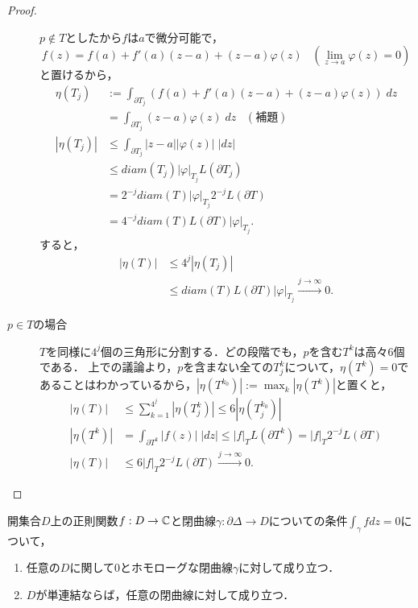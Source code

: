 \documentclass[uplatex, dvipdfmx]{jsreport}
\begin{document}
\begin{proof}
\begin{description}
        $p\notin T$としたから$f$は$a$で微分可能で，
        \[ f(z)=f(a)+f'(a)(z-a)+(z-a)\varphi(z)\;\;\;(\lim_{z\to a}\varphi(z)=0) \]
        と置けるから，
        \begin{align*}
            \eta(T_j)&:=\int_{\partial T_j}(f(a)+f'(a)(z-a)+(z-a)\varphi(z))\;dz\\
            &=\int_{\partial T_j}(z-a)\varphi(z)\;dz\;\;\;(補題)\\
            |\eta(T_j)|&\le\int_{\partial T_j}|z-a||\varphi(z)|\;|dz|\\
            &\le diam(T_j)|\varphi|_{T_j}L(\partial T_j)\\
            &= 2^{-j}diam(T)|\varphi|_{T_j}2^{-j}L(\partial T)\\
            &= 4^{-j}diam(T)L(\partial T)|\varphi|_{T_j}.
        \end{align*}
        すると，
        \begin{align*}
            |\eta(T)|&\le 4^j|\eta(T_j)|\\
            &\le diam(T)L(\partial T)|\varphi|_{T_j}\xrightarrow{j\to\infty}0.
        \end{align*}
        \item[$p\in T$の場合] $T$を同様に$4^j$個の三角形に分割する．どの段階でも，$p$を含む$T^k$は高々$6$個である．
        上での議論より，$p$を含まない全ての$T^k_j$について，$\eta(T^k)=0$であることはわかっているから，$|\eta(T^{k_0})|:=\max_{k}|\eta(T^k)|$と置くと，
        \begin{align*}
            |\eta(T)|&\le\sum^{4^j}_{k=1}|\eta(T^k_j)|\le 6|\eta(T^{k_0}_j)|\\
            |\eta(T^k)|&=\int_{\partial T^k}|f(z)|\;|dz|\le|f|_TL(\partial T^k)=|f|_T2^{-j}L(\partial T)\\
            |\eta(T)|&\le 6|f|_T2^{-j}L(\partial T)\xrightarrow{j\to\infty}0.
        \end{align*}
    \end{description}
\end{proof}

\begin{theorem}[ホモロジーの言葉によるCauchyの定理]
    開集合$D$上の正則関数$f:D\to\mathbb{C}$と閉曲線$\gamma:\partial\Delta\to D$についての条件$\int_\gamma fdz=0$について，
    \begin{enumerate}
        \item 任意の$D$に関して$0$とホモローグな閉曲線$\gamma$に対して成り立つ．
        \item $D$が単連結ならば，任意の閉曲線に対して成り立つ．
    \end{enumerate}
\end{theorem}
\end{document}
